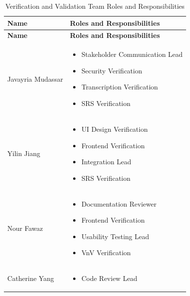 \documentclass[12pt, titlepage]{article}
\renewcommand{\_}{\oldunderscore\allowbreak}
\begin{document}
{\renewcommand{\arraystretch}{1.2}
\begin{longtable}{ | p{4.5cm} | p{8.2cm} | }
  \caption{Verification and Validation Team Roles and Responsibilities} \\
  \hline
  \textbf{Name} & \textbf{Roles and Responsibilities} \\
  \hline
  \endfirsthead
  \hline
  \textbf{Name} & \textbf{Roles and Responsibilities} \\
  \hline
  \endhead
  Javayria Mudassar &
  \begin{itemize}[leftmargin=*, nosep, before=\vspace{1mm}, after=\vspace{1mm}]
    \item Stakeholder Communication Lead
    \item Security Verification
    \item Transcription Verification
    \item SRS Verification
  \end{itemize} \\
  \hline
  Yilin Jiang &
  \begin{itemize}[leftmargin=*, nosep, before=\vspace{1mm}, after=\vspace{1mm}]
    \item UI Design Verification
    \item Frontend Verification
    \item Integration Lead
    \item SRS Verification
  \end{itemize} \\
  \hline
  Nour Fawaz &
  \begin{itemize}[leftmargin=*, nosep, before=\vspace{1mm}, after=\vspace{1mm}]
    \item Documentation Reviewer
    \item Frontend Verification
    \item Usability Testing Lead
    \item VnV Verification
  \end{itemize} \\
  \hline
  Catherine Yang &
  \begin{itemize}[leftmargin=*, nosep, before=\vspace{1mm}, after=\vspace{1mm}]
    \item Code Review Lead

\end{itemize}
\end{longtable}}
\end{document}
